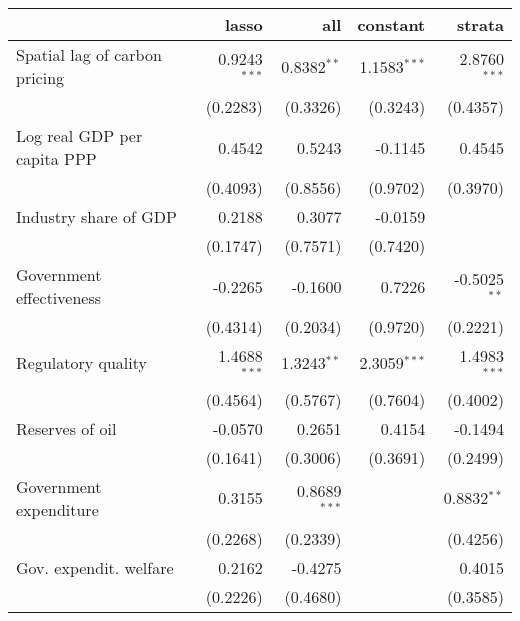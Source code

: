 \begin{tabular}{lrrrr}
\toprule
{} &             lasso &                all &           constant &            strata \\
\midrule
Spatial lag of carbon pricing    &  0.9243$^{* * *}$ &     0.8382$^{* *}$ &   1.1583$^{* * *}$ &  2.8760$^{* * *}$ \\
                                 &          (0.2283) &           (0.3326) &           (0.3243) &          (0.4357) \\
Log real GDP per capita PPP      &            0.4542 &             0.5243 &            -0.1145 &            0.4545 \\
                                 &          (0.4093) &           (0.8556) &           (0.9702) &          (0.3970) \\
Industry share of GDP            &            0.2188 &             0.3077 &            -0.0159 &                   \\
                                 &          (0.1747) &           (0.7571) &           (0.7420) &                   \\
Government effectiveness         &           -0.2265 &            -0.1600 &             0.7226 &   -0.5025$^{* *}$ \\
                                 &          (0.4314) &           (0.2034) &           (0.9720) &          (0.2221) \\
Regulatory quality               &  1.4688$^{* * *}$ &     1.3243$^{* *}$ &   2.3059$^{* * *}$ &  1.4983$^{* * *}$ \\
                                 &          (0.4564) &           (0.5767) &           (0.7604) &          (0.4002) \\
Reserves of oil                  &           -0.0570 &             0.2651 &             0.4154 &           -0.1494 \\
                                 &          (0.1641) &           (0.3006) &           (0.3691) &          (0.2499) \\
Government expenditure           &            0.3155 &   0.8689$^{* * *}$ &                    &    0.8832$^{* *}$ \\
                                 &          (0.2268) &           (0.2339) &                    &          (0.4256) \\
Gov. expendit. welfare           &            0.2162 &            -0.4275 &                    &            0.4015 \\
                                 &          (0.2226) &           (0.4680) &                    &          (0.3585) \\

\end{tabular}
